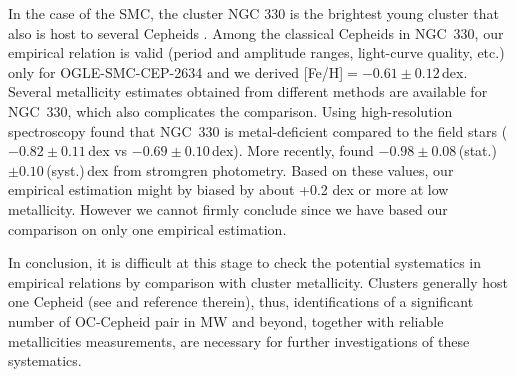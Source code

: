 \documentclass[article]{aa} %
\begin{document}
In the case of the SMC, the cluster NGC 330 is the brightest young cluster that also is host to several Cepheids \citep{SeboWood1994}. Among the classical Cepheids in NGC~330, our empirical relation is valid (period and amplitude ranges, light-curve quality, etc.) only for OGLE-SMC-CEP-2634 and we derived
 [Fe/H]$= - 0.61\pm0.12\,$dex. Several metallicity estimates obtained from different methods are available for NGC~330, which also complicates the comparison. Using high-resolution spectroscopy \cite{Hill1999} found that NGC~330 is metal-deficient compared to the field stars ($-0.82\pm0.11\,$dex vs $-0.69\pm0.10\,$dex). More recently, \cite{Narloch2021} found $-0.98\pm0.08\,$(stat.)$\pm 0.10\,$(syst.)$\,$dex from stromgren photometry. Based on these values, our empirical estimation might by biased by about +0.2 dex or more at low metallicity. However we cannot firmly conclude since we have based our comparison on only one empirical estimation.
 
In conclusion, it is difficult at this stage to check the potential systematics in empirical relations by comparison with cluster metallicity. Clusters  generally host one Cepheid (see \cite{Dinnbier2022} and reference therein), thus, identifications of a significant number of OC-Cepheid pair in MW and beyond, together with reliable metallicities measurements, are necessary for further investigations of these systematics.
\end{document}
